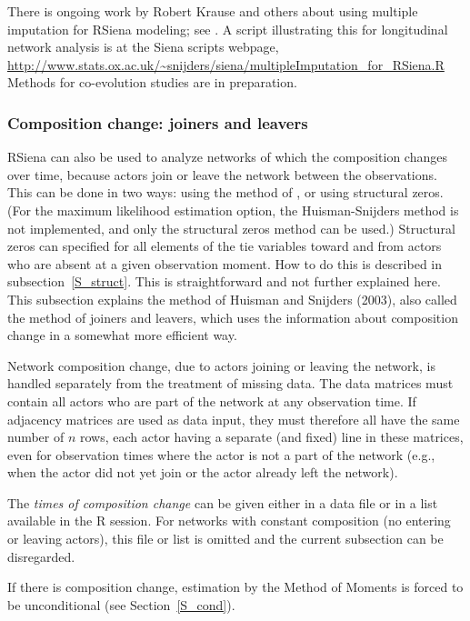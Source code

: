\documentclass[a4paper,fleqn,11pt]{article}
\newcommand{\+}{\, + \,}
\newcommand{\R}{{\sf R }}
\newcommand{\RS}{{\sf \textsf{RSiena} }}
\begin{document}
There is ongoing work by Robert Krause and others about using
multiple imputation for \RS modeling;
see \citet{KHS2018}.
A script illustrating this for longitudinal network analysis
is at the Siena scripts webpage,
\url{http://www.stats.ox.ac.uk/~snijders/siena/multipleImputation_for_RSiena.R}
Methods for co-evolution studies are in preparation.


\subsubsection{Composition change: joiners and leavers}
\label{S_comp}

\RS can also be used to analyze networks of which the composition
changes over time, because actors join or leave the network
between the observations.
This can be done in two ways: using the method of \citet{HuismanSnijders03},
or using structural zeros.
(For the maximum likelihood estimation option, the Huisman-Snijders method
is not implemented, and only the structural zeros method can be used.)
Structural zeros can specified for all elements of the tie variables
toward and from actors who are absent at a given observation moment.
How to do this is described in subsection~\ref{S_struct}.
This is straightforward and not further explained here.
This subsection explains the method of Huisman and Snijders
(2003), also called the method of joiners and leavers,
which uses the information about composition change
in a somewhat more efficient way.

Network composition change, due to actors joining or leaving the
network, is handled separately from the treatment of missing data.
The data matrices must contain all actors who are part of the
network at any observation time.
If adjacency matrices are used as data input, they must therefore
all have the same number of $n$ rows, each actor
having a separate (and fixed) line in these matrices, even for
observation times where the actor is not a part of the network
(e.g., when the actor did not yet join or the actor already left
the network).

The \emph{times of composition change} can be given
either in a data file or in a list available in the \R session.
For networks with constant composition
(no entering or leaving actors), this file or list is
omitted and the current subsection can be disregarded.

If there is composition change, estimation by the Method of Moments
is forced to be unconditional (see Section~\ref{S_cond}).
\end{document}
